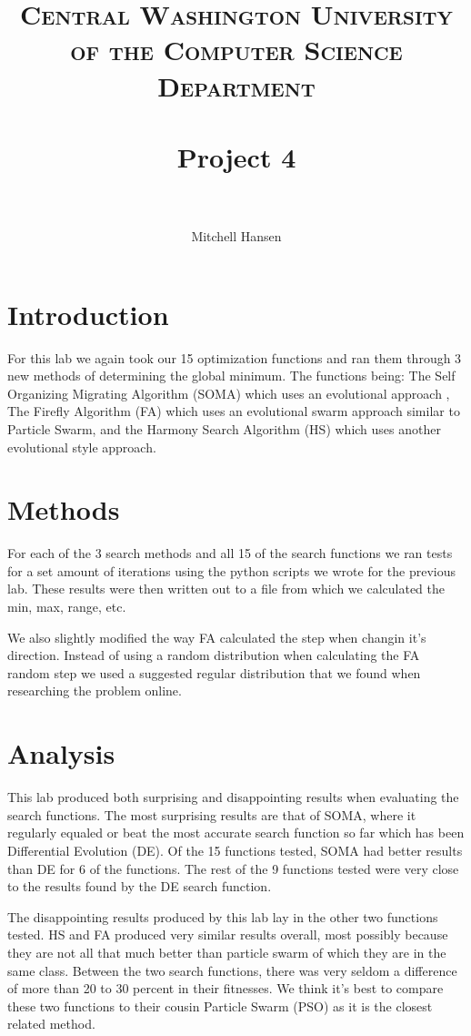 \documentclass[paper=a4, fontsize=11pt]{scrartcl}
\title{
		\usefont{OT1}{bch}{b}{n}
		\normalfont \normalsize \textsc{Central Washington University of the Computer Science Department} \\ [25pt]
		\horrule{0.5pt} \\[0.4cm]
		\huge Project 4 \\
		\horrule{2pt} \\[0.5cm]
}
\author{\normalsize Mitchell Hansen \\[-6pt]}
\numberwithin{equation}{section}
\numberwithin{figure}{section}
\numberwithin{table}{section}
\begin{document}
\maketitle

\section{Introduction}
For this lab we again took our 15 optimization functions and ran them through
3 new methods of determining the global minimum. The functions being:
The Self Organizing Migrating Algorithm (SOMA) which uses an evolutional approach
, The Firefly Algorithm (FA) which uses an evolutional swarm approach
similar to Particle Swarm, and the Harmony Search Algorithm (HS) which uses
another evolutional style approach.

\section{Methods}
For each of the 3 search methods and all 15 of the search functions we ran
tests for a set amount of iterations using the python scripts we wrote
for the previous lab. These results were then written out to a file from which
we calculated the min, max, range, etc.

We also slightly modified the way FA calculated the step when changin it's direction.
Instead of using a random distribution when calculating the FA random step
we used a suggested regular distribution that we found when researching the
problem online.

\section{Analysis}
This lab produced both surprising and disappointing results when evaluating the search functions.
The most surprising results are that of SOMA, where it regularly equaled or beat the most accurate
search function so far which has been Differential Evolution (DE). Of the 15 functions tested, SOMA
had better results than DE for 6 of the functions. The rest of the 9 functions tested were very close
to the results found by the DE search function.

The disappointing results produced by this lab lay in the other two functions tested. HS and FA produced
very similar results overall, most possibly because they are not all that much better than particle
swarm of which they are in the same class. Between the two search functions, there was very seldom
a difference of more than 20 to 30 percent in their fitnesses. We think it's best to compare these
two functions to their cousin Particle Swarm (PSO) as it is the closest related method.
\end{document}
